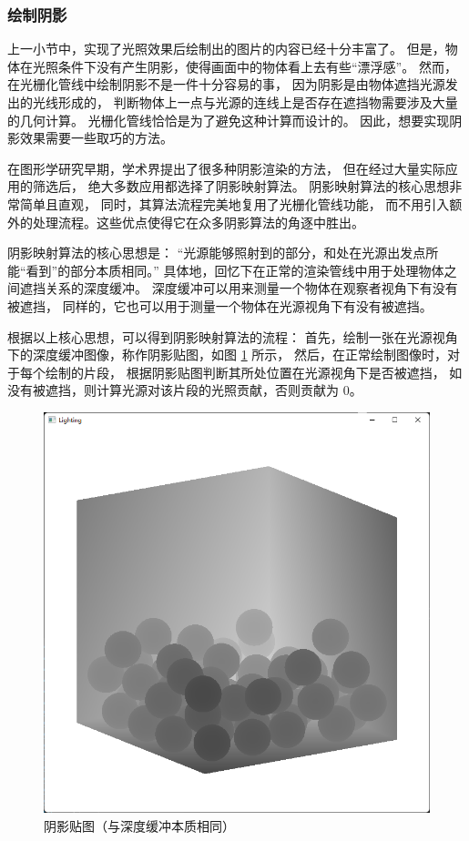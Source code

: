 \documentclass[fontset=windows]{ctexart}
\begin{document}
\subsubsection{绘制阴影}

上一小节中，实现了光照效果后绘制出的图片的内容已经十分丰富了。
但是，物体在光照条件下没有产生阴影，使得画面中的物体看上去有些“漂浮感”。
然而，在光栅化管线中绘制阴影不是一件十分容易的事，
因为阴影是由物体遮挡光源发出的光线形成的，
判断物体上一点与光源的连线上是否存在遮挡物需要涉及大量的几何计算。
光栅化管线恰恰是为了避免这种计算而设计的。
因此，想要实现阴影效果需要一些取巧的方法。

在图形学研究早期，学术界提出了很多种阴影渲染的方法，
但在经过大量实际应用的筛选后，
绝大多数应用都选择了阴影映射算法。
阴影映射算法的核心思想非常简单且直观，
同时，其算法流程完美地复用了光栅化管线功能，
而不用引入额外的处理流程。这些优点使得它在众多阴影算法的角逐中胜出。

阴影映射算法的核心思想是：
“光源能够照射到的部分，和处在光源出发点所能“看到”的部分本质相同。”
具体地，回忆下在正常的渲染管线中用于处理物体之间遮挡关系的深度缓冲。
深度缓冲可以用来测量一个物体在观察者视角下有没有被遮挡，
同样的，它也可以用于测量一个物体在光源视角下有没有被遮挡。

根据以上核心思想，可以得到阴影映射算法的流程：
首先，绘制一张在光源视角下的深度缓冲图像，称作阴影贴图，如图 \ref{fig-gl:shadow-map} 所示，
然后，在正常绘制图像时，对于每个绘制的片段，
根据阴影贴图判断其所处位置在光源视角下是否被遮挡，
如没有被遮挡，则计算光源对该片段的光照贡献，否则贡献为 $0$。

\begin{figure}[htbp]
    \centering
    \includegraphics[width=0.5\linewidth]{imgs/sec 7.2/shadow_map.png}
    \caption{阴影贴图（与深度缓冲本质相同）}
    \label{fig-gl:shadow-map}
\end{figure}
\end{document}
